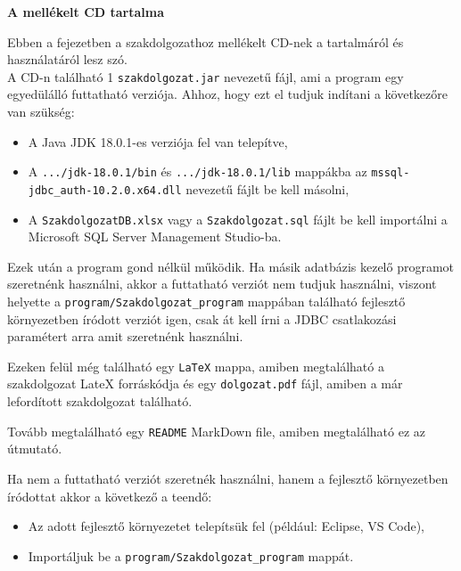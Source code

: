 \pagestyle{empty}

\noindent \textbf{\Large A mellékelt CD tartalma}

\vskip 1cm

Ebben a fejezetben a szakdolgozathoz mellékelt CD-nek a tartalmáról és használatáról lesz szó.\\
A CD-n található 1 \texttt{szakdolgozat.jar} nevezetű fájl, ami a program egy egyedülálló futtatható verziója. Ahhoz, hogy ezt el tudjuk indítani a következőre van szükség:
\begin{itemize}
	\item A Java JDK 18.0.1-es verziója fel van telepítve,
	\item A \texttt{.../jdk-18.0.1/bin} és \texttt{.../jdk-18.0.1/lib} mappákba az \newline \texttt{mssql-jdbc\_auth-10.2.0.x64.dll} nevezetű fájlt be kell másolni,
	\item A \texttt{SzakdolgozatDB.xlsx} vagy a \texttt{Szakdolgozat.sql} fájlt be kell importálni a Microsoft SQL Server Management Studio-ba.
\end{itemize}
Ezek után a program gond nélkül működik. Ha másik adatbázis kezelő programot szeretnénk használni, akkor a futtatható verziót nem tudjuk használni, viszont helyette a \texttt{program/Szakdolgozat\_program} mappában található fejlesztő környezetben íródott verziót igen, csak át kell írni a JDBC csatlakozási paramétert arra amit szeretnénk használni.

Ezeken felül még található egy \texttt{LaTeX} mappa, amiben megtalálható a szakdolgozat LateX forráskódja és egy \texttt{dolgozat.pdf} fájl, amiben a már lefordított szakdolgozat található.

Tovább megtalálható egy \texttt{README} MarkDown file, amiben megtalálható ez az útmutató.

Ha nem a futtatható verziót szeretnék használni, hanem a fejlesztő környezetben íródottat akkor a következő a teendő:
\begin{itemize}
	\item Az adott fejlesztő környezetet telepítsük fel (például: Eclipse, VS Code),
	\item Importáljuk be a \texttt{program/Szakdolgozat\_program} mappát.
\end{itemize}

